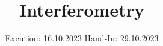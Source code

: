 

\subject{V64}
\title{Interferometry}
\date{%
  Excution: 16.10.2023
  \hspace{3em}
  Hand-In: 29.10.2023
}



\maketitle
\setcounter{page}{1}







\printbibliography{}


